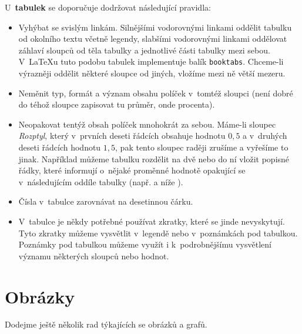 U~\textbf{tabulek} se doporučuje dodržovat následující pravidla:

\begin{itemize} %
\item Vyhýbat se svislým linkám. Silnějšími vodorovnými linkami
  oddělit tabulku od okolního textu včetně legendy, slabšími
  vodorovnými linkami oddělovat záhlaví sloupců od těla tabulky a
  jednotlivé části tabulky mezi sebou. V~\LaTeX u tuto podobu tabulek
  implementuje balík \texttt{booktabs}. Chceme-li výrazněji oddělit
  některé sloupce od jiných, vložíme mezi ně větší mezeru.
\item Neměnit typ, formát a význam obsahu políček v~tomtéž sloupci
  (není dobré do téhož sloupce zapisovat tu průměr, onde procenta).
\item Neopakovat tentýž obsah políček mnohokrát za sebou. Máme-li
  sloupec \textit{Rozptyl}, který v~prvních deseti řádcích obsahuje
  hodnotu $0,5$ a v~druhých deseti řádcích hodnotu $1,5$, pak tento
  sloupec raději zrušíme a vyřešíme to jinak. Například můžeme tabulku
  rozdělit na dvě nebo do ní vložit popisné řádky, které informují
o~nějaké proměnné hodnotě opakující se v~následujícím oddíle tabulky
  (např. \emph{} a níže \emph{}).
\item Čísla v~tabulce zarovnávat na desetinnou čárku.
\item V~tabulce je někdy potřebné používat zkratky, které se jinde
nevyskytují. Tyto zkratky můžeme vysvětlit v~legendě nebo
v~poznámkách pod tabulkou. Poznámky pod tabulkou můžeme využít i
k~podrobnějšímu vysvětlení významu  některých sloupců nebo hodnot.
\end{itemize}

\section{Obrázky}

Dodejme ještě několik rad týkajících se obrázků a grafů.

